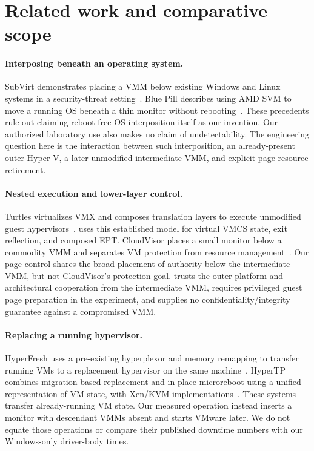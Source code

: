 \section{Related work and comparative scope}
\label{sec:related}
\paragraph{Interposing beneath an operating system.}
SubVirt demonstrates placing a VMM below existing Windows and Linux systems
in a security-threat setting~\cite{subvirt}. Blue Pill describes using AMD SVM
to move a running OS beneath a thin monitor without rebooting~\cite{bluepill}.
These precedents rule out claiming reboot-free OS interposition itself as our
invention. Our authorized laboratory use also makes no claim of undetectability.
The engineering question here is the interaction between such interposition,
an already-present outer Hyper-V, a later unmodified intermediate VMM, and
explicit page-resource retirement.

\paragraph{Nested execution and lower-layer control.}
Turtles virtualizes VMX and composes translation layers to execute unmodified
guest hypervisors~\cite{turtles}. \ks{} uses this established model for virtual
VMCS state, exit reflection, and composed EPT. CloudVisor places a small monitor
below a commodity VMM and separates VM protection from resource
management~\cite{cloudvisor}. Our page control shares the broad placement of
authority below the intermediate VMM, but not CloudVisor's protection goal.
\ks{} trusts the outer platform and architectural cooperation from the
intermediate VMM, requires privileged guest page preparation in the experiment,
and supplies no confidentiality/integrity guarantee against a compromised VMM.

\paragraph{Replacing a running hypervisor.}
HyperFresh uses a pre-existing hyperplexor and memory remapping to transfer
running VMs to a replacement hypervisor on the same machine~\cite{hyperfresh}.
HyperTP combines migration-based replacement and in-place microreboot using a
unified representation of VM state, with Xen/KVM implementations~\cite{hypertp}.
These systems transfer already-running VM state. Our measured operation instead
inserts a monitor with descendant VMMs absent and starts VMware later. We do not
equate those operations or compare their published downtime numbers with our
Windows-only driver-body times.

